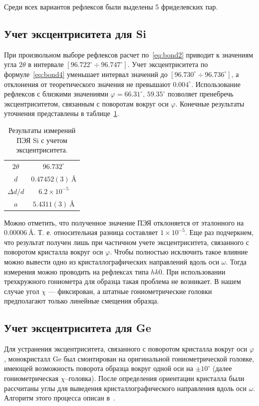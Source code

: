 \documentclass[a4paper,14pt]{extarticle}
\newcommand{\unit}[1]{ \ \text{#1}}
\newcommand{\degree}{^\circ}
\newcommand{\range}[2]{[#1\div#2]}
\begin{document}
Среди всех вариантов рефлексов были выделены 5 фриделевских пар.
\subsection{Учет эксцентриситета для Si}
При произвольном выборе рефлексов расчет по~\ref{eq:bond2} приводит к значениям угла $2\theta$ в интервале $\range{96.722\degree}{96.747\degree}$.
Учет эксцентриситета по формуле~\ref{eq:bond4} уменьшает интервал значений до $\range{96.730\degree}{96.736\degree}$, а отклонения от теоретического значения не превышают $0.004\degree$.
Использование рефлексов с близкими значениями $\varphi = 66.31\degree, \, 59.35\degree$ позволяет пренебречь эксцентриситетом, связанным с поворотам вокруг оси $\varphi$.
Конечные результаты уточнения представлены в таблице~\ref{tab:Si:eccentr}.
\begin{table}[ht!]
    \centering
    \begin{tabular}{ |c|c| }
        \hline
        $2\theta$ & $96.732\degree$ \\
        $d$ & $0.47452 (3)\unit{\AA}$ \\
        $\Delta d / d$ & $6.2 \times 10^{-5}$ \\
        $a$ & $5.4311 (3)\unit{\AA}$ \\
        \hline
    \end{tabular}
    \caption{Результаты измерений ПЭЯ Si с учетом эксцентриситета.}
    \label{tab:Si:eccentr}
\end{table}

Можно отметить, что полученное значение ПЭЯ отклоняется от эталонного на $0.00006\unit{\AA}$.
Т. е. относительная разница составляет $1\times 10^{-5}$.
Еще раз подчеркнем, что результат получен лишь при частичном учете эксцентриситета, связанного с поворотом кристалла вокруг оси $\varphi$.
Чтобы полностью исключить такое влияние можно вывести одно из кристаллографических направлений вдоль оси $\omega$.
Тогда измерения можно проводить на рефлексах типа $hk0$.
При использовании трехкружного гониометра для образца такая проблема не возникает.
В нашем случае угол $\chi$ --- фиксирован, а штатные гониометрические головки предполагают только линейные смещения образца.
\subsection{Учет эксцентриситета для Ge}
Для устранения эксцентриситета, связанного с поворотом кристалла вокруг оси $\varphi$, монокристалл Ge был смонтирован на оригинальной гониометрической головке, имеющей возможность поворота образца вокруг одной оси на $\pm 10\degree$ (далее гониометрическая $\chi$--головка).
После определения ориентации кристалла были рассчитаны углы для выведения кристаллографического направления вдоль оси $\omega$. Алгоритм этого процесса описан в~\cite{Kudryavtsev:2024:eccentr}.
\end{document}
